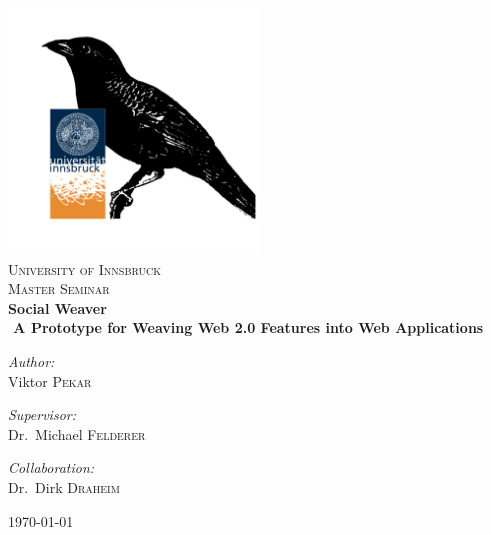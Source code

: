 \documentclass[]{article}
\begin{document}
\begin{titlepage}
\begin{center}


\includegraphics[width=0.5\textwidth]{images/sowebird+uibk.png}~\\[1cm]

\textsc{\LARGE University of Innsbruck}\\[1.5cm]

\textsc{\Large Master Seminar}\\[0.5cm]


{ \huge \bfseries Social Weaver\\
 \large A Prototype for Weaving Web 2.0 Features into Web Applications}\\[0.4cm]


\begin{minipage}{0.4\textwidth}
\begin{flushleft} \large
\emph{Author:}\\
Viktor \textsc{Pekar}
\end{flushleft}
\end{minipage}
\begin{minipage}{0.4\textwidth}
\begin{flushright} \large
\emph{Supervisor:} \\
Dr.~Michael \textsc{Felderer}
\end{flushright}
\begin{flushright} \large
\emph{Collaboration:} \\
Dr.~Dirk \textsc{Draheim}
\end{flushright}

\end{minipage}

\vfill

{\large \today}

\end{center}
\end{titlepage}
\newpage
\end{document}
